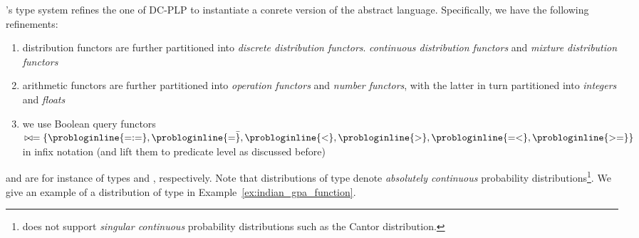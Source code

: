 \dcproblogsty's type system refines the one of DC-PLP to instantiate a conrete version of the abstract language.  Specifically, we have the following refinements:
\begin{enumerate}
    \item distribution functors are further partitioned into \emph{discrete distribution functors}. \emph{continuous distribution functors} and \emph{mixture distribution functors}
    \item arithmetic functors are further partitioned into \emph{operation functors} and \emph{number functors}, with the latter in turn partitioned into \emph{integers} and \emph{floats} 
    \item we use Boolean query functors 	$\bowtie=\{ \text{\probloginline{=:=}}, \text{\probloginline{=\=}}, \text{\probloginline{<}}, \text{\probloginline{>}},  \text{\probloginline{=<}}, \text{\probloginline{>=}} \}$
	in infix notation (and lift them to predicate level as discussed before)
\end{enumerate}


 and  are for instance of types  and  , respectively.
Note that distributions of type  denote {\em absolutely continuous} probability distributions\footnote{\dcproblogsty does not support {\em singular continuous} probability distributions such as the Cantor distribution.}.  We give an example of a distribution of type  in Example~\ref{ex:indian_gpa_function}.


